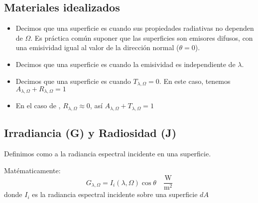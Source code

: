 \documentclass[letterpaper,10pt,english]{jupyterBook}
\let\sphinxpxdimen\pdfpxdimen\else\newdimen\sphinxpxdimen
\begin{document}
\subsection{Materiales idealizados}
\label{\detokenize{6_RadiacionTermica/6_RadiacionTermica:materiales-idealizados}}\begin{itemize}
\item {} 
\sphinxAtStartPar
Decimos que una superficie es  cuando sus propiedades radiativas no dependen de \(\Omega\). Es práctica común suponer que las superficies son emisores difusos, con una emisividad igual al valor de la dirección normal (\(\theta = 0\)).

\end{itemize}
\begin{itemize}
\item {} 
\sphinxAtStartPar
Decimos que una superficie es  cuando la emisividad es independiente de \(\lambda\).

\end{itemize}
\begin{itemize}
\item {} 
\sphinxAtStartPar
Decimos que una superficie es  cuando \(T_{\lambda,\Omega} = 0\). En este caso,
tenemos \(A_{\lambda,\Omega} + R_{\lambda,\Omega} = 1\)

\end{itemize}
\begin{itemize}
\item {} 
\sphinxAtStartPar
En el caso de , \(R_{\lambda,\Omega} \approx 0\), así \(A_{\lambda,\Omega} + T_{\lambda,\Omega} = 1\)

\end{itemize}


\subsection{Irradiancia (G) y Radiosidad (J)}
\label{\detokenize{6_RadiacionTermica/6_RadiacionTermica:irradiancia-g-y-radiosidad-j}}
\sphinxAtStartPar
Definimos como  a la radiancia espectral incidente en una superficie.

\noindent{\hspace*{\fill}\sphinxincludegraphics[width=300\sphinxpxdimen]{{irradiance}.png}\hspace*{\fill}}

\sphinxAtStartPar
Matématicamente:
\label{equation:6_RadiacionTermica/6_RadiacionTermica:1aa8ee01-5f19-4b6b-a74b-924bdfbd97e2}\begin{equation}
G_{\lambda,\Omega} = I_i(\lambda,\Omega) \cos\theta\quad\frac{\mathrm{W}}{\mathrm{m}^2}
\end{equation}
\sphinxAtStartPar
donde \(I_i\) es la radiancia espectral incidente sobre una superficie \(dA\)
\end{document}
